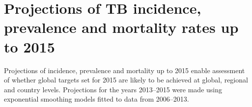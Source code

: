 \section{Projections of TB incidence, prevalence and mortality rates up to 2015} 

Projections of incidence, prevalence and mortality up to 2015 enable assessment of whether global targets set for 2015 are likely to be achieved at global, regional and country levels. Projections for the years 2013–2015 were made using exponential smoothing models fitted to data from 2006–2013.

